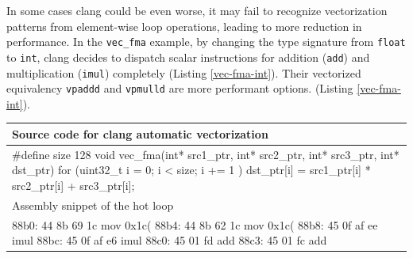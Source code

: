 \documentclass[logo,bsc,singlespacing,parskip]{infthesis}
\newcommand{\dtfloat}{\texttt{float}}
\newenvironment{VerbatimCompact}
  {\vspace*{-2.5mm}\VerbatimEnvironment
   \par\Verbatim}
  {\endVerbatim\vspace*{-2.4mm}}
\begin{document}
In some cases clang could be even worse, it may fail to recognize vectorization
patterns from element-wise loop operations, leading to more reduction in
performance. In the \texttt{vec\_fma} example, by changing the type signature
from \dtfloat{} to \texttt{int}, clang decides to dispatch scalar
instructions for addition (\texttt{add}) and multiplication (\texttt{imul})
completely (Listing \ref{vec-fma-int}). Their vectorized equivalency
\texttt{vpaddd} and \texttt{vpmulld} are more performant options. (Listing
\ref{vec-fma-int}).

\begin{table}[H]\captionsetup{name=Listing}
\captionsetup{justification=centering}
\begin{tabular}{>{\raggedright\arraybackslash}p{14cm}}
    Source code for clang automatic vectorization\\
    \midrule
    \begin{VerbatimCompact}
#define size 128
void vec_fma(int* src1_ptr, int* src2_ptr, 
             int* src3_ptr, int* dst_ptr) {
    for (uint32_t i = 0; i < size; i += 1 ){
        dst_ptr[i] = src1_ptr[i] * src2_ptr[i] + src3_ptr[i];
    }
}
    \end{VerbatimCompact}
    \\
    Assembly snippet of the hot loop\\
    \midrule
    \begin{VerbatimCompact}
88b0: 44 8b 69 1c  mov    0x1c(%
88b4: 44 8b 62 1c  mov    0x1c(%
88b8: 45 0f af ee  imul   %
88bc: 45 0f af e6  imul   %
88c0: 45 01 fd     add    %
88c3: 45 01 fc     add    %
    \end{VerbatimCompact}
    \\


\end{tabular}
\end{table}
\end{document}

